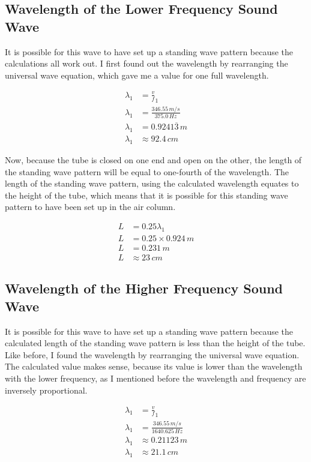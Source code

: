 \documentclass[12pt]{article}
\numberwithin{equation}{section}
\begin{document}
\subsection{Wavelength of the Lower Frequency Sound Wave}

It is possible for this wave to have set up a standing wave pattern because the calculations all work out. I first found out the wavelength by rearranging the universal wave equation, which gave me a value for one full wavelength.

\begin{align}
\lambda_{1}&=\frac{v}{f}_{1}\\
\lambda_{1}&=\frac{346.55\,m/s}{375.0\,Hz}\\
\lambda_{1}&=0.9241\overline{3}\,m\\
\lambda_{1}&\approx92.4\,cm
\end{align}

Now, because the tube is closed on one end and open on the other, the length of the standing wave pattern will be equal to one-fourth of the wavelength. The length of the standing wave pattern, using the calculated wavelength equates to the height of the tube, which means that it is possible for this standing wave pattern to have been set up in the air column.

\begin{align}
L&=0.25\lambda_{1}\\
L&=0.25\times0.924\,m\\
L&=0.231\,m\\
L&\approx23\,cm
\end{align}

\subsection{Wavelength of the Higher Frequency Sound Wave}

It is possible for this wave to have set up a standing wave pattern because the calculated length of the standing wave pattern is less than the height of the tube. Like before, I found the wavelength by rearranging the universal wave equation. The calculated value makes sense, because its value is lower than the wavelength with the lower frequency, as I mentioned before the wavelength and frequency are inversely proportional.

\begin{align}
\lambda_{1}&=\frac{v}{f}_{1}\\
\lambda_{1}&=\frac{346.55\,m/s}{1640.625\,Hz}\\
\lambda_{1}&\approx0.21123\,m\\
\lambda_{1}&\approx21.1\,cm
\end{align}
\end{document}
